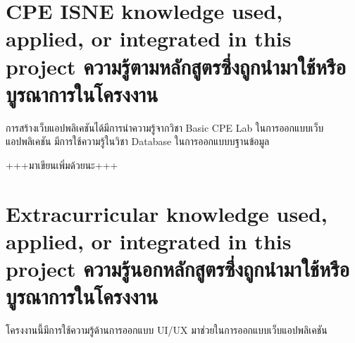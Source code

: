 \section{\ifenglish%
\ifcpe CPE \else ISNE \fi knowledge used, applied, or integrated in this project
\else%
ความรู้ตามหลักสูตรซึ่งถูกนำมาใช้หรือบูรณาการในโครงงาน
\fi
}
การสร้างเว็บแอปพลิเคชันได้มีการนำความรู้จากวิชา Basic CPE Lab ในการออกแบบเว็บแอปพลิเคชัน มีการใช้ความรู้ในวิชา Database
ในการออกแบบบฐานข้อมูล

+++มาเขียนเพิ่มด้วยนะ+++
\section{\ifenglish%
Extracurricular knowledge used, applied, or integrated in this project
\else%
ความรู้นอกหลักสูตรซึ่งถูกนำมาใช้หรือบูรณาการในโครงงาน
\fi
}
โครงงานนี้มีการใช้ความรู้ด้านการออกแบบ UI/UX มาช่วยในการออกแบบเว็บแอปพลิเคชัน 
